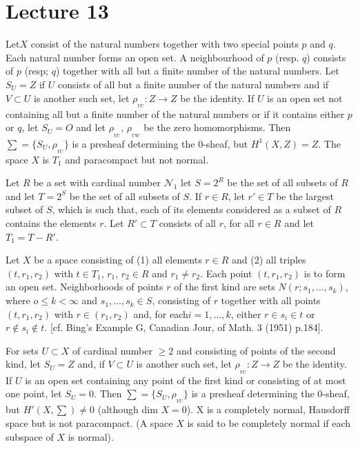 \chapter{Lecture 13}

\begin{exam}
Let\pageoriginale $X$ consist of the natural numbers together with two special
points $p$ and $q$. Each natural number forms an open set. A
neighbourhood of $p$ (resp. $q$) consists of $p$ (resp; $q$) together
with all but a finite number of the natural numbers. Let $S_U = Z$ if
$U$ consists of all but a finite number of the natural numbers and if
$V \subset U$ is another such set, let $\rho_{_{VU}}:Z \to Z$ be the
identity. If $U$ is an open set not containing all but a finite number
of the natural numbers or if it contains either $p$ or $q$, let
$S_U=O$ and let $\rho_{_{VU}}$, $\rho_{_{UW}}$ be the zero homomorphisms. Then
$\sum =\{ S_U,\rho_{_{VU}} \}$ is a presheaf determining the 0-sheaf,
but $H^1(X,Z)=Z$. The space $X$ is $T_1$ and paracompact but not
normal. 
\end{exam}

\begin{exam}\label{chap13:exam18}%
Let $R$ be a set with cardinal number $\mathscr{N}_1$ let $S=2^R$ be
the set of all subsets of $R$ and let $T=2^S$ be the set of all
subsets of $S$. If $r \in R$, let $r' \in T$ be the largest subset
of $S$, which is such that, each of its elements considered as a
subset of $R$ contains the elements $r$. Let $R'\subset T$ consists of
all $r$, for all $r \in R$ and let $T_1=T-R'$. 
\end{exam}

Let $X$ be a space consisting of (1) all elements $r \in R$ and
(2) all triples $(t,r_1,r_2)$ with $t \in T_1$, $r_1$, $r_2 \in R$ and
$r_1 \neq r_2$. Each point $(t,r_1,r_2)$ is to form an open
set. Neighborhoods of points $r$ of the first kind are sets $N(r;s_1,
\ldots ,s_k)$, where $o \leq k< \infty$ and $s_1, \ldots ,s_k \in S$,
consisting of $r$ together with all points $(t,r_1,r_2)$ with $r \in
(r_1, r_2)$ and, for each\pageoriginale $i=1, \ldots, k$, either $r
\in s_i \in t$ 
or $r \notin s_i \notin t$. [cf. Bing's Example G, Canadian Jour,
  of Math. 3 (1951) p.184]. 

For  sets $U \subset X$ of cardinal number $\ge 2$ and consisting of
points of the second kind, let $S_U=Z$ and, if $V \subset U$ is
another such set, let $\rho_{_{VU}}: Z \to Z$  be the identity. If $U$ is
an open set containing any point of the first kind or consisting  of
at most one point, let $S_U=0$. Then $\sum = \bigg\{ S_U,
\rho_{_{VU}}\bigg\}$ is a presheaf determining the 0-sheaf, but $H'(X,
\sum) \neq 0$ (although dim $X=0$). X is a completely normal,
Hausdorff space but is not paracompact. (A space $X$ is said to be
completely  normal if each subspace of $X$ is normal). 

